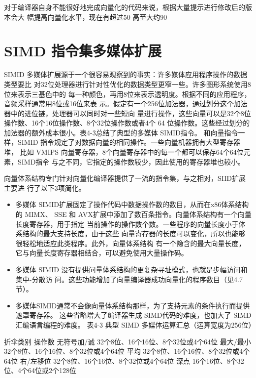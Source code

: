 对于编译器自身不能很好地完成向量化的代码来说，根据大量提示进行修改后的版本会大
幅提高向量化水平，现在有超过50%
高至大约90%

\section{SIMD 指令集多媒体扩展}
SIMID 多媒体扩展源于一个很容易观察到的事实：许多媒体应用程序操作的数据类型要比
对32位处理器进行针对性优化的数据类型更窄一些。许多图形系统使用8位来表示三基色中的
每一种颜色，再用8位来表示透明度。根据不同的应用程序，音频采样通常用8位或16位来表
示。假定有一个256位加法器，通过划分这个加法器中的进位链，处理器可以同时对一些短向
量进行操作，这些向量可以是32个8位操作数、16个16位操作数、8个32位操作数或者4个
64 位操作数。这些经过划分的加法器的额外成本很小。表4-3总结了典型的多媒体 SIMID指令。
和向量指令一样，SIMID 指令规定了对数据向量的相同操作。一些向量机器拥有大型寄存器堆，
比如 VMIPS 向量寄存器，8个向量寄存器中的每一个都可以保存64个64位元素，SIMD指令
与之不同，它指定的操作数较少，因此使用的寄存器堆也较小。

向量体系结构专门针对向量化编译器提供了一流的指令集，与之相对，SIID扩展主要进
行了以下3项简化。

\begin{itemize}
    \item 多媒体 SIMID扩展固定了操作代码中数据操作数的数目，从而在x86体系结构的 MIMX、
    SSE 和 AVX扩展中添加了数百条指令。向量体系结构有一个向量长度寄存器，用于指定
    当前操作的操作数个数。一些程序的向量长度小于体系结构的最大支持长度，由于这些
    向量寄存器的长度可以变化，所以也能够很轻松地适应此类程序。此外，向量体系结构
    有一个隐含的最大向量长度，它与向量长度寄存器相结合，可以避免使用大量操作码。
    
    \item 多媒体 SIMID 没有提供问量体系结构的更复杂寻址模式，也就是步幅访问和集中-分散访
    问。这些功能增加了向量编译器成功向量化的程序数目（见4.7节）。
    
    \item 多媒体SIMID通常不会像向量体系结构那样，为了支持元素的条件执行而提供遮罩寄存器。
    这些省略增大了编译器生成 SIMD代码的难度，也加大了 SIMD 汇编语言编程的难度。
    表4-3 典型 SIMD 多媒体运算汇总（运算宽度为256位）
\end{itemize}

折伞类别
操作数
无符号加/诚
32个8位、16个16位、8个32位或4个64位
最大/最小
32个8位、16个16位、8个32位或4个64位
平均
32个8位、16个16位、8个32位或4个64位
右/左移位
32个8位、16个16位、8个32位或4个64位
深点
16个16位、8个32位、4个64位或2个128位


